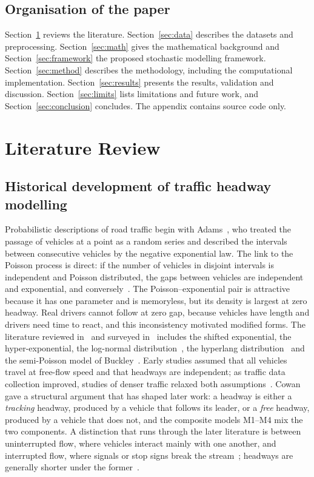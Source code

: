 \documentclass[11pt,a4paper]{article}
\numberwithin{equation}{section}
\begin{document}
\subsection{Organisation of the paper}
Section~\ref{sec:lit} reviews the literature. Section~\ref{sec:data} describes the datasets and preprocessing.
Section~\ref{sec:math} gives the mathematical background and Section~\ref{sec:framework} the proposed stochastic modelling
framework. Section~\ref{sec:method} describes the methodology, including the computational implementation.
Section~\ref{sec:results} presents the results, validation and discussion. Section~\ref{sec:limits} lists limitations and
future work, and Section~\ref{sec:conclusion} concludes. The appendix contains source code only.

\section{Literature Review}\label{sec:lit}

\subsection{Historical development of traffic headway modelling}
Probabilistic descriptions of road traffic begin with Adams~\cite{adams1936}, who treated the passage of vehicles at a
point as a random series and described the intervals between consecutive vehicles by the negative exponential law. The link to the Poisson process is direct: if the number of
vehicles in disjoint intervals is independent and Poisson distributed, the gaps between vehicles are independent and exponential, and conversely~\cite{adams1936,may1990,cox1962}.
The Poisson--exponential pair is attractive because it has one parameter and is memoryless, but its density is largest at zero headway. Real drivers cannot follow at zero gap, because vehicles have length
and drivers need time to react, and this inconsistency motivated modified forms. The literature reviewed in~\cite{leungbootnak} and surveyed in~\cite{li2017survey} includes the shifted exponential,
the hyper-exponential, the log-normal distribution~\cite{greenberg1966}, the hyperlang distribution~\cite{dawson1968} and the semi-Poisson model of Buckley~\cite{buckley1968}.
Early studies assumed that all vehicles travel at free-flow speed and that headways are independent; as traffic data collection improved, studies of denser traffic relaxed both assumptions~\cite{leungbootnak}.
Cowan~\cite{cowan1975} gave a structural argument that has shaped later work: a headway is either a \emph{tracking} headway, produced by a vehicle that follows its leader,
or a \emph{free} headway, produced by a vehicle that does not, and the composite models M1--M4 mix the two components.
A distinction that runs through the later literature is between uninterrupted flow, where vehicles interact mainly with one another, and interrupted flow, where signals or stop signs
break the stream~\cite{hcm2000}; headways are generally shorter under the former~\cite{leungbootnak}.
\end{document}
